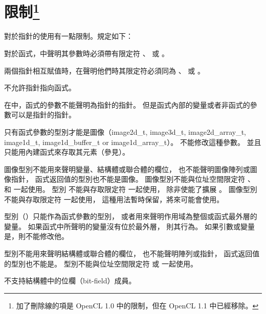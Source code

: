 \section[sec:restrictions]{限制\footnote{
加了刪除線的項是 OpenCL 1.0 中的限制，但在 OpenCL 1.1 中已經移除。}}

\startigBig

\startitem
對於指針的使用有一點限制。規定如下：
\startigBig

\startitem
對於函式，中聲明其參數時必須帶有限定符
 、  或 。
\stopitem

\startitem
兩個指針相互賦值時，在聲明他們時其限定符必須同為
 、  或 。
\stopitem

\startitem
不允許指針指向函式。
\stopitem

\startitem
在中，函式的參數不能聲明為指針的指針。
但是函式內部的變量或者非函式的參數可以是指針的指針。
\stopitem

\stopigBig
\stopitem

\startitem
只有函式參數的型別才能是圖像（image2d_t, image3d_t, image2d_array_t, image1d_t,
image1d_buffer_t or image1d_array_t）。
不能修改這種參數。
並且只能用內建函式來存取其元素（參見）。

圖像型別不能用來聲明變量、結構體或聯合體的欄位，
也不能聲明圖像陣列或圖像指針，
函式返回值的型別也不能是圖像。
圖像型別不能與位址空間限定符
 、  和  一起使用。
型別  不能與存取限定符  一起使用，
除非使能了擴展 。
圖像型別不能與存取限定符  一起使用，
這種用法暫時保留，將來可能會使用。

型別（）只能作為函式參數的型別，
或者用來聲明作用域為整個或函式最外層的變量。
如果函式中所聲明的變量沒有位於最外層，
則其行為。
如果引數或變量是，則不能修改他。

型別不能用來聲明結構體或聯合體的欄位，
也不能聲明陣列或指針，
函式返回值的型別也不能是。
型別不能與位址空間限定符  或  一起使用。
\stopitem

\startitem
不支持結構體中的位欄（bit-field）成員。
\stopitem

